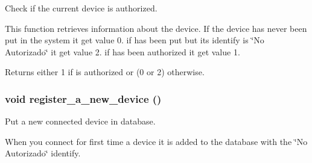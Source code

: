 Check if the current device is authorized. 

This function retrieves information about the device. If the device has never been put in the system it get value 0. if has been put but its identify is \char`\"{}No Autorizado\char`\"{} it get value 2. if has been authorized it get value 1. \begin{DoxyReturn}{Returns}
either 1 if is authorized or (0 or 2) otherwise. 
\end{DoxyReturn}
\hypertarget{usb-control_8c_a10395957994d66e936a4cb1e68fe47aa}{
\subsubsection[{register\_\-a\_\-new\_\-device}]{\setlength{\rightskip}{0pt plus 5cm}void register\_\-a\_\-new\_\-device ()}}
\label{usb-control_8c_a10395957994d66e936a4cb1e68fe47aa}


Put a new connected device in database. 

When you connect for first time a device it is added to the database with the \char`\"{}No Autorizado\char`\"{} identify. 
